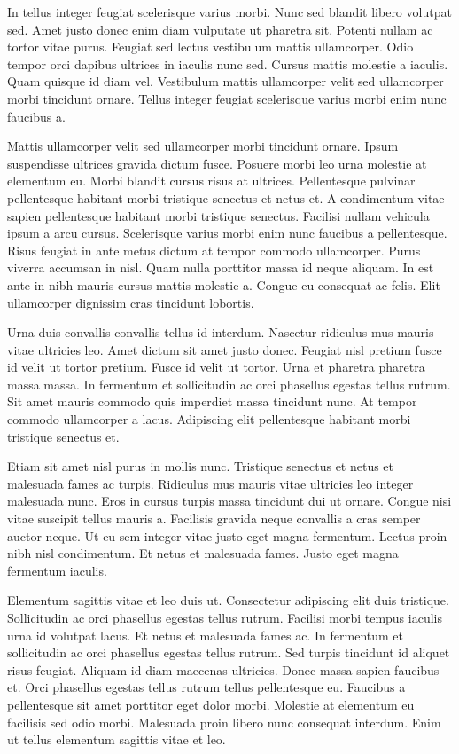 In tellus integer feugiat scelerisque varius morbi. Nunc sed blandit libero volutpat sed. Amet justo donec enim diam vulputate ut pharetra sit. Potenti nullam ac tortor vitae purus. Feugiat sed lectus vestibulum mattis ullamcorper. Odio tempor orci dapibus ultrices in iaculis nunc sed. Cursus mattis molestie a iaculis. Quam quisque id diam vel. Vestibulum mattis ullamcorper velit sed ullamcorper morbi tincidunt ornare. Tellus integer feugiat scelerisque varius morbi enim nunc faucibus a.

Mattis ullamcorper velit sed ullamcorper morbi tincidunt ornare. Ipsum suspendisse ultrices gravida dictum fusce. Posuere morbi leo urna molestie at elementum eu. Morbi blandit cursus risus at ultrices. Pellentesque pulvinar pellentesque habitant morbi tristique senectus et netus et. A condimentum vitae sapien pellentesque habitant morbi tristique senectus. Facilisi nullam vehicula ipsum a arcu cursus. Scelerisque varius morbi enim nunc faucibus a pellentesque. Risus feugiat in ante metus dictum at tempor commodo ullamcorper. Purus viverra accumsan in nisl. Quam nulla porttitor massa id neque aliquam. In est ante in nibh mauris cursus mattis molestie a. Congue eu consequat ac felis. Elit ullamcorper dignissim cras tincidunt lobortis.

Urna duis convallis convallis tellus id interdum. Nascetur ridiculus mus mauris vitae ultricies leo. Amet dictum sit amet justo donec. Feugiat nisl pretium fusce id velit ut tortor pretium. Fusce id velit ut tortor. Urna et pharetra pharetra massa massa. In fermentum et sollicitudin ac orci phasellus egestas tellus rutrum. Sit amet mauris commodo quis imperdiet massa tincidunt nunc. At tempor commodo ullamcorper a lacus. Adipiscing elit pellentesque habitant morbi tristique senectus et.

Etiam sit amet nisl purus in mollis nunc. Tristique senectus et netus et malesuada fames ac turpis. Ridiculus mus mauris vitae ultricies leo integer malesuada nunc. Eros in cursus turpis massa tincidunt dui ut ornare. Congue nisi vitae suscipit tellus mauris a. Facilisis gravida neque convallis a cras semper auctor neque. Ut eu sem integer vitae justo eget magna fermentum. Lectus proin nibh nisl condimentum. Et netus et malesuada fames. Justo eget magna fermentum iaculis.

Elementum sagittis vitae et leo duis ut. Consectetur adipiscing elit duis tristique. Sollicitudin ac orci phasellus egestas tellus rutrum. Facilisi morbi tempus iaculis urna id volutpat lacus. Et netus et malesuada fames ac. In fermentum et sollicitudin ac orci phasellus egestas tellus rutrum. Sed turpis tincidunt id aliquet risus feugiat. Aliquam id diam maecenas ultricies. Donec massa sapien faucibus et. Orci phasellus egestas tellus rutrum tellus pellentesque eu. Faucibus a pellentesque sit amet porttitor eget dolor morbi. Molestie at elementum eu facilisis sed odio morbi. Malesuada proin libero nunc consequat interdum. Enim ut tellus elementum sagittis vitae et leo.
